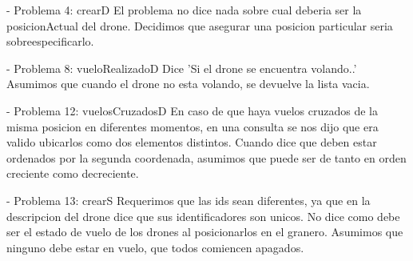 - Problema 4: crearD\newline
El problema no dice nada sobre cual deberia ser la posicionActual del drone. Decidimos que asegurar una posicion particular seria sobreespecificarlo.\newline
\vspace{5mm}

- Problema 8: vueloRealizadoD\newline
Dice 'Si el drone se encuentra volando..' Asumimos que cuando el drone no esta volando, se devuelve la lista vacia. \newline
\vspace{5mm}

- Problema 12: vuelosCruzadosD\newline
En caso de que haya vuelos cruzados de la misma posicion en diferentes momentos, en una consulta se nos dijo que era valido ubicarlos como dos elementos distintos. \newline
Cuando dice que deben estar ordenados por la segunda coordenada, asumimos que puede ser de tanto en orden creciente como decreciente.\newline
\vspace{5mm}

- Problema 13: crearS\newline
Requerimos que las ids sean diferentes, ya que en la descripcion del drone dice que sus identificadores son unicos.\newline
No dice como debe ser el estado de vuelo de los drones al posicionarlos en el granero. Asumimos que ninguno debe estar en vuelo, que todos comiencen apagados. \newline
\vspace{5mm}



